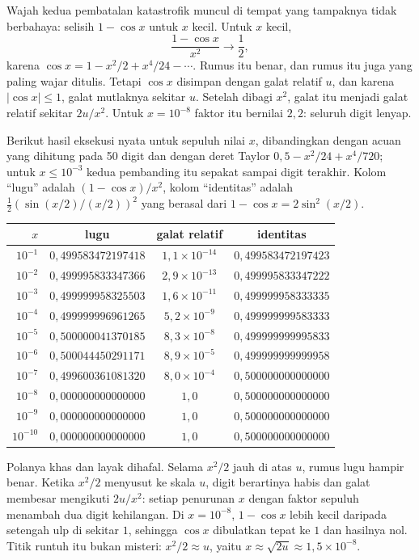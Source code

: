 Wajah kedua pembatalan katastrofik muncul di tempat yang tampaknya tidak berbahaya:
selisih $1-\cos x$ untuk $x$ kecil. Untuk $x$ kecil,
\[
  \frac{1-\cos x}{x^{2}}\longrightarrow\frac{1}{2},
\]
karena $\cos x=1-x^{2}/2+x^{4}/24-\cdots$. Rumus itu benar, dan rumus itu juga yang
paling wajar ditulis. Tetapi $\cos x$ disimpan dengan galat relatif $u$, dan karena
$|\cos x|\le1$, galat mutlaknya sekitar $u$. Setelah dibagi $x^{2}$, galat itu menjadi
galat relatif sekitar $2u/x^{2}$. Untuk $x=10^{-8}$ faktor itu bernilai $2{,}2$:
seluruh digit lenyap.

Berikut hasil eksekusi nyata untuk sepuluh nilai $x$, dibandingkan dengan acuan yang
dihitung pada 50 digit dan dengan deret Taylor $0{,}5-x^{2}/24+x^{4}/720$; untuk
$x\le10^{-3}$ kedua pembanding itu sepakat sampai digit terakhir. Kolom ``lugu'' adalah
$(1-\cos x)/x^{2}$, kolom ``identitas'' adalah
$\tfrac12\left(\sin(x/2)/(x/2)\right)^{2}$ yang berasal dari
$1-\cos x=2\sin^{2}(x/2)$.

\begin{center}
\begin{tabular}{rccc}
\hline
$x$ & lugu & galat relatif & identitas \\
\hline
$10^{-1}$ & $0{,}499583472197418$ & $1{,}1\times10^{-14}$ & $0{,}499583472197423$ \\
$10^{-2}$ & $0{,}499995833347366$ & $2{,}9\times10^{-13}$ & $0{,}499995833347222$ \\
$10^{-3}$ & $0{,}499999958325503$ & $1{,}6\times10^{-11}$ & $0{,}499999958333335$ \\
$10^{-4}$ & $0{,}499999996961265$ & $5{,}2\times10^{-9}$ & $0{,}499999999583333$ \\
$10^{-5}$ & $0{,}500000041370185$ & $8{,}3\times10^{-8}$ & $0{,}499999999995833$ \\
$10^{-6}$ & $0{,}500044450291171$ & $8{,}9\times10^{-5}$ & $0{,}499999999999958$ \\
$10^{-7}$ & $0{,}499600361081320$ & $8{,}0\times10^{-4}$ & $0{,}500000000000000$ \\
$10^{-8}$ & $0{,}000000000000000$ & $1{,}0$ & $0{,}500000000000000$ \\
$10^{-9}$ & $0{,}000000000000000$ & $1{,}0$ & $0{,}500000000000000$ \\
$10^{-10}$ & $0{,}000000000000000$ & $1{,}0$ & $0{,}500000000000000$ \\
\hline
\end{tabular}
\end{center}

Polanya khas dan layak dihafal. Selama $x^{2}/2$ jauh di atas $u$, rumus lugu hampir
benar. Ketika $x^{2}/2$ menyusut ke skala $u$, digit berartinya habis dan galat
membesar mengikuti $2u/x^{2}$: setiap penurunan $x$ dengan faktor sepuluh menambah dua
digit kehilangan. Di $x=10^{-8}$, $1-\cos x$ lebih kecil daripada setengah ulp di
sekitar $1$, sehingga $\cos x$ dibulatkan tepat ke $1$ dan hasilnya nol. Titik runtuh
itu bukan misteri: $x^{2}/2\approx u$, yaitu $x\approx\sqrt{2u}\approx1{,}5\times10^{-8}$.


